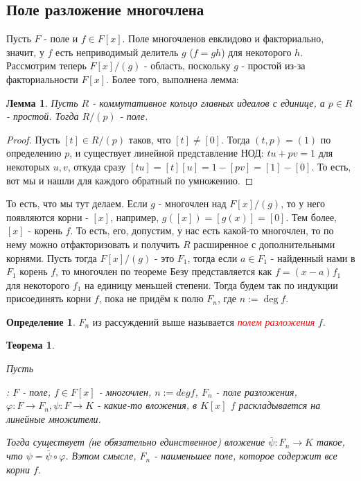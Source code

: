 \documentclass[a4paper,100pt]{article}
\theoremstyle{indented}
\newtheorem{theorem}{Теорема}
\newtheorem{lemma}{Лемма}
\theoremstyle{definition}
\newtheorem{defn}{Определение}
\theoremstyle{remark}
\begin{document}
\resetall

\subsection{Поле разложение многочлена}

Пусть $F$ - поле и $f\in F[x]$. Поле многочленов евклидово и факториально, значит, у $f$ есть неприводимый делитель $g$ ($f=gh$) для некоторого $h$. Рассмотрим теперь  $F[x]/(g)$ - область, поскольку $g$ - простой из-за факториальности $F[x]$. Более того, выполнена лемма:\\

\begin{lemma}
    Пусть $R$ - коммутативное кольцо главных идеалов с единице, а $p\in R$ - простой. Тогда $R/(p)$ - поле. 
\end{lemma}

\begin{proof}
    Пусть $[t]\in R/(p)$ таков, что $[t]\neq [0]$. Тогда $(t, p)=(1)$ по определению $p$, и существует линейной представление НОД: $tu+pv=1$ для некоторых $u, v$, откуда сразу $[tu]=[t][u]=1-[pv]=[1]-[0]$. То есть, вот мы и нашли для каждого обратный по умножению.
\end{proof}

То есть, что мы тут делаем. Если $g$ - многочлен над $F[x]/(g)$, то у него появляются корни - $[x]$, например, $g([x])=[g(x)]=[0]$. Тем более, $[x]$ - корень $f$. То есть, его, допустим, у нас есть какой-то многочлен, то по нему можно отфакторизовать и получить $R$ расширенное с дополнительными корнями. Пусть тогда $F[x]/(g)$ - это $F_1$, тогда если $a\in F_1$ - найденный нами в $F_1$ корень $f$, то многочлен по теореме Безу представляется как $f=(x-a)f_1$ для некоторого $f_1$ на единицу меньшей степени. Тогда будем так по индукции присоединять корни $f$, пока не придём к полю $F_n$, где $n:=\deg f$.

\begin{defn}
    $F_n$ из рассуждений выше называется \hypertarget{n37}{\textcolor{red}{\textit{полем разложения}}} $f$.
\end{defn}

\begin{theorem}
    \hypertarget{t6}{Пусть}: $F$ - поле, $f\in F[x]$ - многочлен, $n:=deg f$, $F_n$ - поле разложения, $\varphi: F\rightarrow F_n, \psi : F\rightarrow K$ - какие-то вложения, в $K[x]$ $f$ раскладывается на линейные множители.\ 

    Тогда существует (не обязательно единственное) вложение $\bar{\psi}:F_n\rightarrow K$ такое, что $\psi=\bar{\psi}\circ \varphi$. Вэтом смысле, $F_n$ - наименьшее поле, которое содержит все корни $f$.
\end{theorem}
\end{document}
